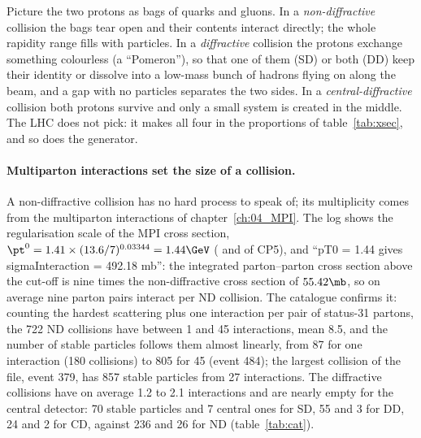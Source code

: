 \begin{plainwords}
Picture the two protons as bags of quarks and gluons. In a \emph{non-diffractive} collision the bags tear
open and their contents interact directly; the whole rapidity range fills with particles. In a
\emph{diffractive} collision the protons exchange something colourless (a ``Pomeron''), so that one of them
(SD) or both (DD) keep their identity or dissolve into a low-mass bunch of hadrons flying on along the beam,
and a gap with no particles separates the two sides. In a \emph{central-diffractive} collision both protons
survive and only a small system is created in the middle. The LHC does not pick: it makes all four in the
proportions of table~\ref{tab:xsec}, and so does the generator.
\end{plainwords}

\paragraph{Multiparton interactions set the size of a collision.} A non-diffractive collision has no hard
process to speak of; its multiplicity comes from the multiparton interactions of chapter~\ref{ch:04_MPI}.
The log shows the regularisation scale of the MPI cross section, $\pt^0 = 1.41\times(13.6/7)^{0.03344} =
1.44\GeV$ ( and  of CP5), and ``pT0 = 1.44 gives sigmaInteraction = 492.18 mb'':
the integrated parton--parton cross section above the cut-off is nine times the non-diffractive cross
section of $55.42\mb$, so on average nine parton pairs interact per ND collision. The catalogue confirms it:
counting the hardest scattering plus one interaction per pair of status-31 partons, the 722 ND collisions
have between 1 and 45 interactions, mean 8.5, and the number of stable particles follows them almost
linearly, from 87 for one interaction (180 collisions) to 805 for 45 (event 484); the largest collision of
the file, event 379, has 857 stable particles from 27 interactions. The diffractive collisions have on
average 1.2 to 2.1 interactions and are nearly empty for the central
detector: 70 stable particles and 7 central ones for SD, 55 and 3 for DD, 24 and 2 for CD, against 236 and
26 for ND (table~\ref{tab:cat}).

